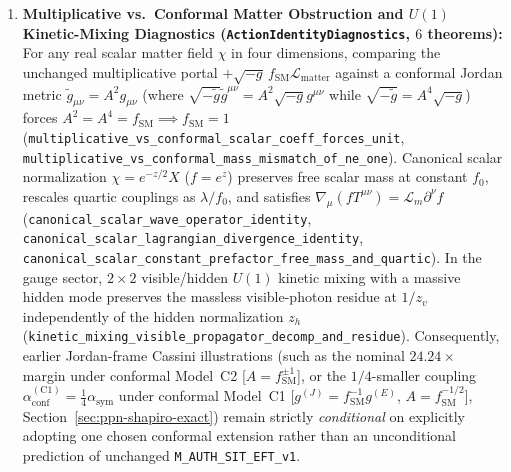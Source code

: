 \begin{enumerate}[leftmargin=2em]
  \item \textbf{Multiplicative vs.\ Conformal Matter Obstruction and $U(1)$ Kinetic-Mixing Diagnostics (\texttt{ActionIdentityDiagnostics}, $6$ theorems):} For any real scalar matter field $\chi$ in four dimensions, comparing the unchanged multiplicative portal $+\sqrt{-g}\,f_{\mathrm{SM}}\mathcal{L}_{\mathrm{matter}}$ against a conformal Jordan metric $\tilde{g}_{\mu\nu} = A^2 g_{\mu\nu}$ (where $\sqrt{-\tilde{g}}\tilde{g}^{\mu\nu} = A^2\sqrt{-g}g^{\mu\nu}$ while $\sqrt{-\tilde{g}} = A^4\sqrt{-g}$) forces $A^2 = A^4 = f_{\mathrm{SM}} \implies f_{\mathrm{SM}} = 1$ (\texttt{multiplicative\_\allowbreak{}vs\_\allowbreak{}conformal\_\allowbreak{}scalar\_\allowbreak{}coeff\_\allowbreak{}forces\_\allowbreak{}unit}, \texttt{multiplicative\_\allowbreak{}vs\_\allowbreak{}conformal\_\allowbreak{}mass\_\allowbreak{}mismatch\_\allowbreak{}of\_\allowbreak{}ne\_\allowbreak{}one}). Canonical scalar normalization $\chi = e^{-z/2}X$ ($f = e^z$) preserves free scalar mass at constant $f_0$, rescales quartic couplings as $\lambda/f_0$, and satisfies $\nabla_\mu(f T^{\mu\nu}) = \mathcal{L}_m \partial^\nu f$ (\texttt{canonical\_\allowbreak{}scalar\_\allowbreak{}wave\_\allowbreak{}operator\_\allowbreak{}identity}, \texttt{canonical\_\allowbreak{}scalar\_\allowbreak{}lagrangian\_\allowbreak{}divergence\_\allowbreak{}identity}, \texttt{canonical\_\allowbreak{}scalar\_\allowbreak{}constant\_\allowbreak{}prefactor\_\allowbreak{}free\_\allowbreak{}mass\_\allowbreak{}and\_\allowbreak{}quartic}). In the gauge sector, $2\times 2$ visible/hidden $U(1)$ kinetic mixing with a massive hidden mode preserves the massless visible-photon residue at $1/z_v$ independently of the hidden normalization $z_h$ (\texttt{kinetic\_\allowbreak{}mixing\_\allowbreak{}visible\_\allowbreak{}propagator\_\allowbreak{}decomp\_\allowbreak{}and\_\allowbreak{}residue}). Consequently, earlier Jordan-frame Cassini illustrations (such as the nominal $24.24\times$ margin under conformal Model~C2 [$A = f_{\mathrm{SM}}^{\pm 1}$], or the $1/4$-smaller coupling $\alpha_{\mathrm{conf}}^{(\mathrm{C1})} = \frac{1}{4}\alpha_{\mathrm{sym}}$ under conformal Model~C1 [$g^{(J)} = f_{\mathrm{SM}}^{-1}g^{(E)}$, $A = f_{\mathrm{SM}}^{-1/2}$], Section~\ref{sec:ppn-shapiro-exact}) remain strictly \emph{conditional} on explicitly adopting one chosen conformal extension rather than an unconditional prediction of unchanged \texttt{M\_AUTH\_SIT\_EFT\_v1}.

\end{enumerate}
